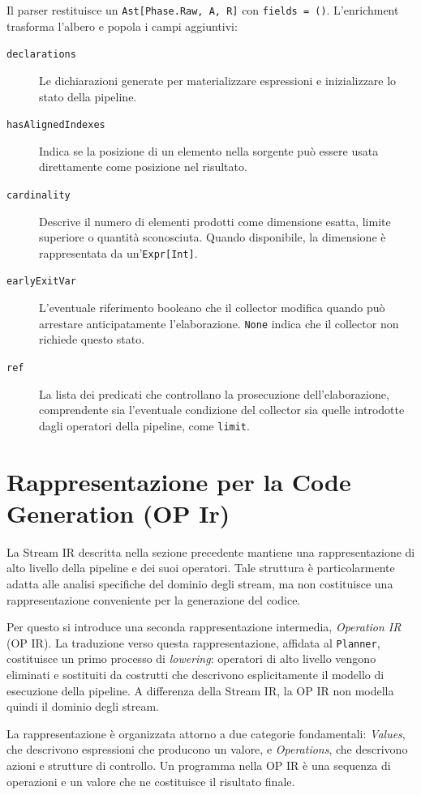 \documentclass[a4paper,11pt]{report}
\theoremstyle{definition}
\begin{document}
Il parser restituisce un \texttt{Ast[Phase.Raw, A, R]} con \texttt{fields = ()}. L'enrichment trasforma l'albero e popola i campi aggiuntivi:

\begin{description}
  \item[\texttt{declarations}] Le dichiarazioni generate per materializzare espressioni e inizializzare lo stato della pipeline.
  \item[\texttt{hasAlignedIndexes}] Indica se la posizione di un elemento nella sorgente può essere usata direttamente come posizione nel risultato.
  \item[\texttt{cardinality}] Descrive il numero di elementi prodotti come dimensione esatta, limite superiore o quantità sconosciuta. Quando disponibile, la dimensione è rappresentata da un'\texttt{Expr[Int]}.
  \item[\texttt{earlyExitVar}] L'eventuale riferimento booleano che il collector modifica quando può arrestare anticipatamente l'elaborazione. \texttt{None} indica che il collector non richiede questo stato.
  \item[\texttt{ref}] La lista dei predicati che controllano la prosecuzione dell'elaborazione, comprendente sia l'eventuale condizione del collector sia quelle introdotte dagli operatori della pipeline, come \texttt{limit}.
\end{description}

\section{Rappresentazione per la Code Generation (OP Ir)}
\label{sec:op-ir}

La Stream IR descritta nella sezione precedente mantiene una rappresentazione di alto livello della pipeline e dei suoi operatori. Tale struttura è particolarmente adatta alle analisi specifiche del dominio degli stream, ma non costituisce una rappresentazione conveniente per la generazione del codice.

Per questo si introduce una seconda rappresentazione intermedia, \emph{Operation IR} (OP IR). La traduzione verso questa rappresentazione, affidata al \texttt{Planner}, costituisce un primo processo di \emph{lowering}: operatori di alto livello vengono eliminati e sostituiti da costrutti che descrivono esplicitamente il modello di esecuzione della pipeline. A differenza della Stream IR, la OP IR non modella quindi il dominio degli stream.

La rappresentazione è organizzata attorno a due categorie fondamentali: \emph{Values}, che descrivono espressioni che producono un valore, e \emph{Operations}, che descrivono azioni e strutture di controllo. Un programma nella OP IR è una sequenza di operazioni e un valore che ne costituisce il risultato finale.
\end{document}
